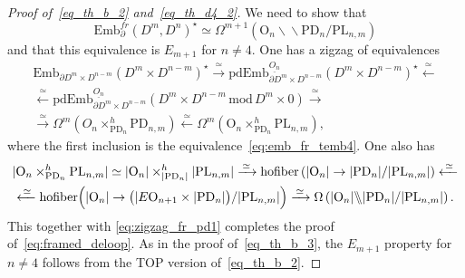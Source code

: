 \documentclass[11pt]{amsart}
\theoremstyle{definition}
\newcommand{\Embfrmn}{\mathrm{Emb}_\partial^{fr}(D^m,D^n)}
\newcommand{\Emb}{\mathrm{Emb}}
\newcommand{\pdEmb}{\mathrm{pdEmb}}
\newcommand{\PL}{\mathrm{PL}}
\newcommand{\OO}{\mathrm{O}}
\newcommand{\PD}{\mathrm{PD}}
\newcommand{\mmod}{\,\mathrm{mod}\,}
\newcommand{\hofiber}{\mathrm{hofiber}}
\newcommand{\bbslash}{\backslash\!\!\backslash}
\numberwithin{equation}{section}
\begin{document}
\begin{proof}[Proof of~\eqref{eq_th_b_2} and~\eqref{eq_th_d4_2}]
We need to show that 
\begin{equation}\label{eq:framed_deloop}
\Embfrmn^\star\simeq\Omega^{m+1}\left(\OO_n\bbslash\PD_n/\PL_{n,m}\right)
\end{equation}
and that this equivalence is $E_{m+1}$ for $n\neq 4$. One has a zigzag of equivalences
\begin{multline}\label{eq:zigzag_fr_pd1}
\Emb_{\partial D^{m}\times D^{n-m}}(D^{m}\times D^{n-m})^\star \xrightarrow{\,\simeq\,}
\pdEmb_{\partial D^{m}\times D^{n-m}}^{\underline{O_n}}(D^{m}\times D^{n-m})^\star
\xleftarrow{\,\simeq\,} \\
\xleftarrow{\,\simeq\,}\pdEmb_{\partial D^{m}\times D^{n-m}}^{\underline{O_n}}(D^{m}\times D^{n-m}\mmod D^{m}\times 0)
\xrightarrow{\,\simeq\,}\\
\xrightarrow{\,\simeq\,}\Omega^{m}\left(O_n\times^h_{\PD_n}\PD_{n,m}\right)
\xleftarrow{\,\simeq\,} \Omega^{m}\left(\OO_n\times^h_{\PD_n}\PL_{n,m}\right) ,
\end{multline}
where the first inclusion is the equivalence~\eqref{eq:emb_fr_temb4}. One also has 
\begin{multline}\label{eq:zigzag_fr_pd2}
|\OO_n\times^h_{\PD_n}\PL_{n,m}| %
\simeq\left|\OO_n\right|\times^h_{|\PD_n|}\left|\PL_{n,m}\right|
\xrightarrow{\,\simeq\,}
\hofiber\left(|\OO_n|\to |\PD_n|/|\PL_{n,m}|\right)
\xleftarrow{\,\simeq\,}     \\
\xleftarrow{\,\simeq\,}  \hofiber\Bigl(|\OO_n|\to \bigl(|E\OO_{n+1}\times |\PD_n|\bigr)/|\PL_{n,m}|\Bigr) 
\xrightarrow{\,\simeq\,}
\Omega\left(|\OO_n|\bbslash|\PD_n|/|\PL_{n,m}|\right).
\end{multline}
This together with \eqref{eq:zigzag_fr_pd1} completes the proof of~\eqref{eq:framed_deloop}. As in the proof of~\eqref{eq_th_b_3}, the
$E_{m+1}$ property for $n\neq 4$ follows from the TOP version of~\eqref{eq_th_b_2}.
\end{proof}
\end{document}
